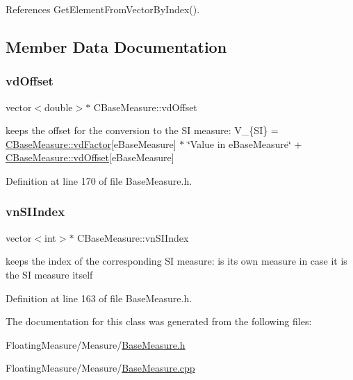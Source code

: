 References Get\+Element\+From\+Vector\+By\+Index().



\subsection{Member Data Documentation}
\mbox{\label{classCBaseMeasure_a7220e3dfd4fbdd319a5c3c6af844259e}} 
\subsubsection{\texorpdfstring{vd\+Offset}{vdOffset}}
{\footnotesize\ttfamily vector$<$double$>$$\ast$ C\+Base\+Measure\+::vd\+Offset}



keeps the offset for the conversion to the SI measure\+: V\+\_\+\{SI\} = \hyperlink{classCVectorHandle_af8f8b2e0da8363e695872ca85f33364e}{C\+Base\+Measure\+::vd\+Factor}\mbox{[}e\+Base\+Measure\mbox{]} $\ast$ \char`\"{}\+Value in e\+Base\+Measure\char`\"{} + \hyperlink{classCBaseMeasure_a7220e3dfd4fbdd319a5c3c6af844259e}{C\+Base\+Measure\+::vd\+Offset}\mbox{[}e\+Base\+Measure\mbox{]} 



Definition at line 170 of file Base\+Measure.\+h.

\mbox{\label{classCBaseMeasure_aaaddf8a6ce321b282885953439472390}} 
\subsubsection{\texorpdfstring{vn\+S\+I\+Index}{vnSIIndex}}
{\footnotesize\ttfamily vector$<$int$>$$\ast$ C\+Base\+Measure\+::vn\+S\+I\+Index}



keeps the index of the corresponding SI measure\+: is its own measure in case it is the SI measure itself 



Definition at line 163 of file Base\+Measure.\+h.



The documentation for this class was generated from the following files\+:\begin{DoxyCompactItemize}
\item 
Floating\+Measure/\+Measure/\hyperlink{BaseMeasure_8h}{Base\+Measure.\+h}\item 
Floating\+Measure/\+Measure/\hyperlink{BaseMeasure_8cpp}{Base\+Measure.\+cpp}\end{DoxyCompactItemize}
